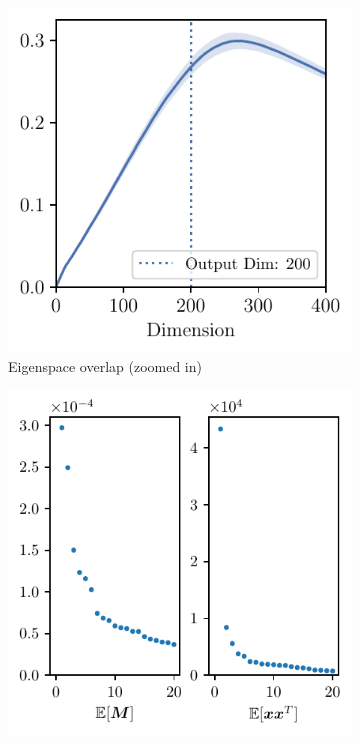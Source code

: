 \begin{figure}[H]
    \centering
    \begin{subfigure}[b]{0.24\textwidth}
        \centering
        \captionsetup{justification=centering}
        \includegraphics[width=\textwidth]{Appendix_Figures/Overlap_large_model/FailCases/late/CIFAR10_VGG11W200_fxlr0.01_conv2.pdf}
        \caption{Eigenspace overlap (zoomed in)}
        \label{fig:app_adexp_vgg2_ovlp}
    \end{subfigure}%
    \begin{subfigure}[b]{0.24\textwidth}
        \centering
        \captionsetup{justification=centering}
        \includegraphics[width=\textwidth]{Appendix_Figures/Overlap_large_model/FailExplanation/VGGlate/sigvals_t20_CIFAR10_Exp1_VGG11W200_fxlr0.01_E-1_features.3.pdf}

\end{subfigure}
\end{figure}

